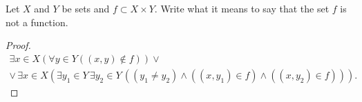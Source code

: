 \begin{exercise}
    Let $X$ and $Y$ be sets and $f\subset X\times Y$. Write what it means to say that the set $f$ is not a function.
\end{exercise}

\begin{proof}
    \begin{multline*}
        \exists x\in X\left( \forall y\in Y \left((x, y)\notin f\right) \right) \lor \\
        \lor\,\exists x\in X\left(\exists y_{1}\in Y\,\exists y_{2}\in Y\,\left((y_{1}\ne y_{2})\land ((x, y_{1})\in f)\land ((x, y_{2})\in f) \right)\right).
    \end{multline*}
\end{proof}
\newpage
